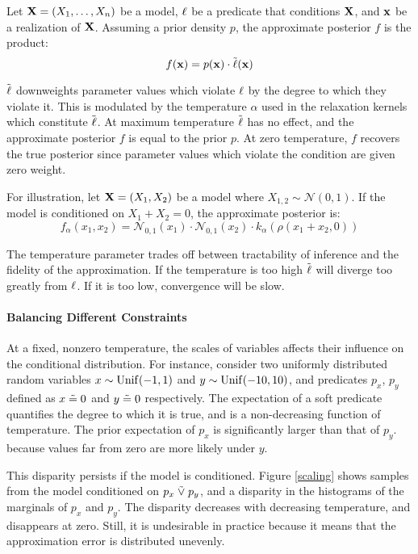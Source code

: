 \begin{definition}
Let $\mathbf{X} = (X_1, \dots, X_n)$ be a model, $\operatorname{\ell}$ be a predicate that conditions $\mathbf{X}$, and  $\mathbf{x}$ be a realization of $\mathbf{X}$.
Assuming a prior density $p$, the approximate posterior $f$ is the product:
\begin{equation}\label{fpm}
f(\mathbf{x}) = p(\mathbf{x}) \cdot \tilde{\operatorname{\ell}}(\mathbf{x})
  \end{equation}
\end{definition}
$\mathrel{\tilde{\operatorname{\ell}}}$ downweights parameter values which violate $\operatorname{\ell}$ by the degree to which they violate it. 
This is modulated by the temperature $\alpha$ used in the  relaxation kernels which constitute $\mathrel{\tilde{\operatorname{\ell}}}$.
At maximum temperature $\mathrel{\tilde{\operatorname{\ell}}}$ has no effect, and the approximate posterior $f$ is equal to the prior $p$.
At zero temperature, $f$ recovers the true posterior since parameter values which violate the condition are given zero weight.

For illustration, let $\mathbf{X} = (X_1, X_2)$ be a model where $X_{1,2} \sim \mathcal{N}(0, 1)$.
If the model is conditioned on $X_1 + X_2 = 0$, the approximate posterior is:
\begin{equation}\label{approxposterior}
f_\alpha(x_1, x_2) = \mathcal{N}_{0,1}(x_1) \cdot \mathcal{N}_{0,1}(x_2) \cdot k_\alpha(\rho(x_1 + x_2, 0)) 
\end{equation}

The temperature parameter trades off between tractability of inference and the fidelity of the approximation.
If the temperature is too high $\mathrel{\tilde{\operatorname{\ell}}}$ will diverge too greatly from $\operatorname{\ell}$. If it is too low, convergence will be slow.

\paragraph{Balancing Different Constraints}
At a fixed, nonzero temperature, the scales of variables affects their influence on
the conditional distribution.
For instance, consider two uniformly distributed random variables $x \sim \operatorname{Unif}(-1, 1)$ and $y \sim \operatorname{Unif}(-10, 10)$,
and predicates $p_x$, $p_y$ defined as $x \mathrel{\tilde{=}} 0$ and $y \mathrel{\tilde{=}} 0$ respectively.
The expectation of a soft predicate quantifies the degree to which it is true, and is a non-decreasing function of temperature.
The prior expectation of $p_x$ is significantly larger than that of $p_y$.
because values far from zero are more likely under $y$.

This disparity persists if the model is conditioned.
Figure \ref{scaling} shows samples from the model conditioned on $p_x \mathrel{\tilde{\lor}} p_y$, and a disparity in the histograms of the marginals of $p_x$ and $p_y$.
The disparity decreases with decreasing temperature, and disappears at zero.
Still, it is undesirable in practice because it means that the approximation error is distributed unevenly.

